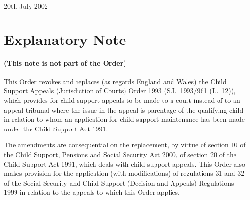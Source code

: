 \documentclass[12pt,a4paper]{article}
\begin{document}
20th July 2002

\small

\part{Explanatory Note}

\renewcommand\parthead{— Explanatory Note}

\subsection*{(This note is not part of the Order)}

This Order revokes and replaces (as regards England and Wales) the Child Support Appeals (Jurisdiction of Courts) Order 1993 (S.I.\ 1993/961 (L.\ 12)), which provides for child support appeals to be made to a court instead of to an appeal tribunal where the issue in the appeal is parentage of the qualifying child in relation to whom an application for child support maintenance has been made under the Child Support Act 1991.

The amendments are consequential on the replacement, by virtue of section 10 of the Child Support, Pensions and Social Security Act 2000, of section 20 of the Child Support Act 1991, which deals with child support appeals. This Order also makes provision for the application (with modifications) of regulations 31 and 32 of the Social Security and Child Support (Decision and Appeals) Regulations 1999 in relation to the appeals to which this Order applies. 
\end{document}
